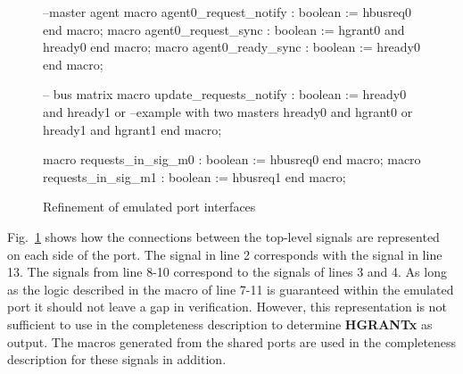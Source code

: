 \begin{figure}[h!]
\begin{VHI}
--master agent
macro agent0_request_notify : boolean := hbusreq0 end macro;
macro agent0_request_sync : boolean := hgrant0 and hready0 end macro;
macro agent0_ready_sync : boolean := hready0 end macro;

-- bus matrix
macro update_requests_notify : boolean :=
 hready0 and hready1 or --example with two masters
 hready0 and hgrant0 or
 hready1 and hgrant1
end macro;

macro requests_in_sig_m0 : boolean := hbusreq0 end macro;
macro requests_in_sig_m1 : boolean := hbusreq1 end macro;
\end{VHI}
\caption{Refinement of emulated port interfaces}
\label{fig:em-port-refine}
\end{figure}

Fig.~\ref{fig:em-port-refine} shows how the connections between the top-level signals are represented on each side of the port. The signal in line 2 corresponds with the signal in line 13. The signals from line 8-10 correspond to the signals of lines 3 and 4. As long as the logic described in the macro of line 7-11 is guaranteed within the emulated port it should not leave a gap in verification. However, this representation is not sufficient to use in the completeness description to determine \textbf{HGRANTx} as output. The macros generated from the shared ports are used in the completeness description for these signals in addition. 
  

